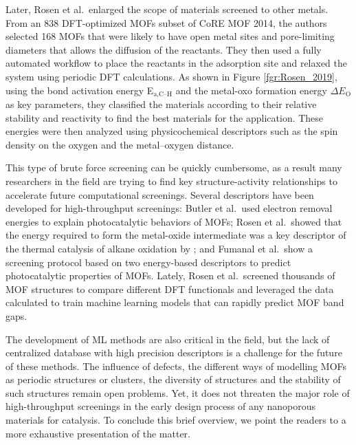 \documentclass[main.tex]{subfiles}
\begin{document}
Later, Rosen et al.\ enlarged the scope of materials screened to other metals.\cite{Rosen_2019} From an 838 DFT-optimized MOFs subset of CoRE MOF 2014, the authors selected 168 MOFs that were likely to have open metal sites and pore-limiting diameters that allows the diffusion of the reactants. They then used a fully automated workflow to place the reactants in the adsorption site and relaxed the system using periodic DFT calculations. As shown in Figure \ref{fgr:Rosen_2019}, using the bond activation energy E$_\text{a,C--H}$ and the metal-oxo formation energy $\Delta E_\text{O}$ as key parameters, they classified the materials according to their relative stability and reactivity to find the best materials for the application. These energies were then analyzed using physicochemical descriptors such as the spin density on the oxygen and the metal--oxygen distance.

This type of brute force screening can be quickly cumbersome, as a result many researchers in the field are trying to find key structure-activity relationships to accelerate future computational screenings.
Several descriptors have been developed for high-throughput screenings: Butler et al.\ used electron removal energies to explain photocatalytic behaviors of MOFs;\cite{Butler_2014} Rosen et al.\ showed that the energy required to form the metal-oxide intermediate was a key descriptor of the thermal catalysis of alkane oxidation by ;\cite{Rosen_HTPDFT_2019} and Fumanal et al.\ show a screening protocol based on two energy-based descriptors to predict photocatalytic properties of MOFs.\cite{Fumanal_descriptor_2020} {Lately, Rosen et al.\ screened thousands of MOF structures to compare different DFT functionals and leveraged the data calculated to train machine learning models that can rapidly predict MOF band gaps.\cite{Rosen_2022_high} }

The development of ML methods are also critical in the field,\cite{Rosen_2021} but the lack of centralized database with high precision descriptors is a challenge for the future of these methods. The influence of defects, the different ways of modelling MOFs as periodic structures or clusters, the diversity of structures and the stability of such structures remain open problems. Yet, it does not threaten the major role of high-throughput screenings in the early design process of any nanoporous materials for catalysis. To conclude this brief overview, we point the readers to a more exhaustive presentation of the matter.\cite{Rosen_2022}
\end{document}
